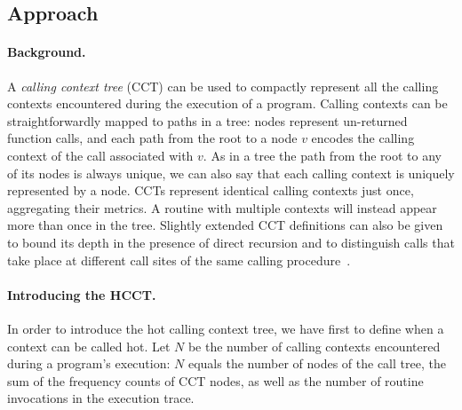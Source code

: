 
\subsection{Approach}
\label{ss:hcct-approach}

\paragraph*{Background.} A {\em calling context tree} (CCT) can be used to compactly represent all the calling contexts encountered during the execution of a program. Calling contexts can be straightforwardly mapped to paths in a tree: nodes represent un-returned function calls, and each path from the root to a node $v$ encodes the calling context of the call associated with $v$. As in a tree the path from the root to any of its nodes is always unique, we can also say that each calling context is uniquely represented by a node. CCTs represent identical calling contexts just once, aggregating their metrics. A routine with multiple contexts will instead appear more than once in the tree. Slightly extended CCT definitions can also be given to bound its depth in the presence of direct recursion and to distinguish calls that take place at different call sites of the same calling procedure~\cite{Ammons97}.


\paragraph*{Introducing the HCCT.} In order to introduce the hot calling context tree, we have first to define when a context can be called hot. Let $N$ be the number of calling contexts encountered during a program's execution: $N$ equals the number of nodes of the call tree, the sum of the frequency counts of CCT nodes, as well as the number of routine invocations in the execution trace. 

